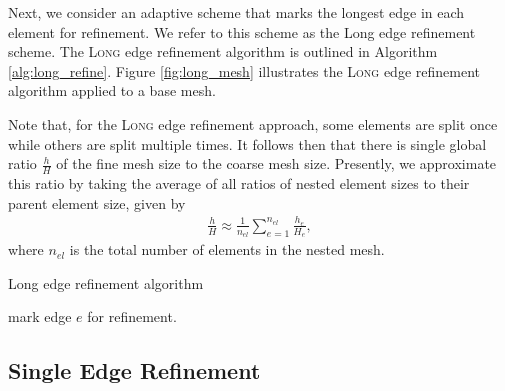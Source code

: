Next, we consider an adaptive scheme that marks
the longest edge in each element for refinement.
We refer to this scheme as the Long edge
refinement scheme. The \textsc{Long} edge refinement
algorithm is outlined in Algorithm \ref{alg:long_refine}.
Figure \ref{fig:long_mesh} illustrates the
\textsc{Long} edge refinement algorithm applied to
a base mesh.

Note that, for the \textsc{Long} edge refinement
approach, some elements are split once while others
are split multiple times. It follows then that there is
single global ratio $\frac{h}{H}$ of the fine mesh size
to the coarse mesh size. Presently, we approximate
this ratio by taking the average of all ratios
of nested element sizes to their parent element
size, given by
%
\begin{gather}
\frac{h}{H} \approx \frac{1}{n_{el}}
\sum_{e=1}^{n_{el}} \frac{h_e}{H_e},
\label{eq:refine_ratio}
\end{gather}
%
where $n_{el}$ is the total number of elements
in the nested mesh.

\begin{algorithm}
\caption{Long edge refinement algorithm}
\begin{algorithmic}
\State mark edge $e$ for refinement.
\EndIf
\EndFor
\EndFor
\end{algorithmic}
\label{alg:long_refine}
\end{algorithm}

\subsection{Single Edge Refinement}

